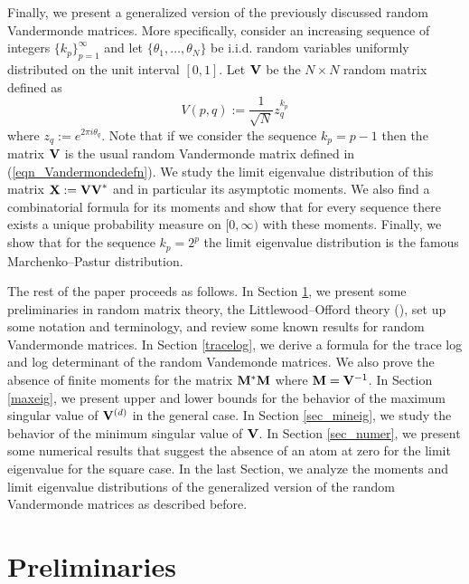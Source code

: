 \documentclass[smallextended]{svjour3}
\begin{document}
\par Finally, we present a generalized version of the previously discussed random Vandermonde matrices. More specifically, consider an increasing sequence of integers $\{k_{p}\}_{p=1}^{\infty}$ and let $\{\theta_{1},\ldots,\theta_{N}\}$ be i.i.d. random variables uniformly distributed on the unit interval $[0,1]$. Let ${\bf V}$ be the $N\times N$ random matrix defined as
\begin{equation} 
V(p,q):=\frac{1}{\sqrt{N}}z_{q}^{k_p}
\end{equation} 
where $z_{q}:=e^{2\pi i\theta_{q}}$. Note that if we consider the sequence $k_p=p-1$ then the matrix ${\bf  V}$ is the usual random Vandermonde matrix defined in  (\ref{eqn_Vandermondedefn}). We study the limit eigenvalue distribution of this matrix ${\bf X}:={\bf VV}^{*}$ and in particular its asymptotic moments. We also find a combinatorial formula for its moments and show that for every sequence there exists a unique probability measure on $[0,\infty)$ with these moments. Finally, we show that for the sequence $k_p=2^p$ the limit eigenvalue distribution is the famous Marchenko--Pastur distribution. 

\par The rest of the paper proceeds as follows. In Section \ref{sec:rand_mat_ess}, we present some preliminaries in random matrix theory, the Littlewood--Offord theory (\cite{taovu}), set up some notation and terminology, and review some known results for random Vandermonde matrices. In Section \ref{tracelog}, we derive a formula for the trace log and log determinant of the random Vandemonde matrices. We also prove the absence of finite moments for the matrix ${\bf M}^{*}{\bf M}$ where ${\bf M}={\bf V}^{-1}$. In Section \ref{maxeig}, we present upper and lower bounds for the behavior of the maximum singular value of ${\bf V}^{(d)}$ in the general case. In Section \ref{sec_mineig}, we study the behavior of the  minimum singular value of ${\bf V}$. In Section \ref{sec_numer}, we present some numerical results that suggest the absence of an atom at zero for the limit eigenvalue for the square case. In the last Section, we analyze the moments and limit eigenvalue distributions of the generalized version of the random Vandermonde matrices as described before.

\section{Preliminaries}\label{sec:rand_mat_ess}
\end{document}

